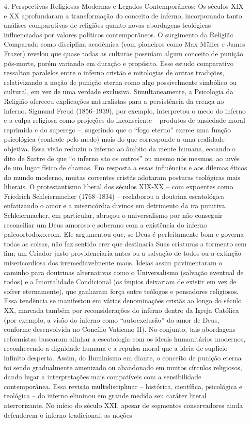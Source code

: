 4. Perspectivas Religiosas Modernas e Legados Contemporâneos: Os séculos XIX e XX aprofundaram a transformação do conceito de inferno, incorporando tanto análises comparativas de religiões quanto novas abordagens teológicas influenciadas por valores políticos contemporâneos. O surgimento da Religião Comparada como disciplina acadêmica (com pioneiros como Max Müller e James Frazer) revelou que quase todas as culturas possuíam algum conceito de punição pós-morte, porém variando em duração e propósito. Esse estudo comparativo ressaltou paralelos entre o inferno cristão e mitologias de outras tradições, relativizando a noção de punição eterna como algo possivelmente simbólico ou cultural, em vez de uma verdade exclusiva. Simultaneamente, a Psicologia da Religião ofereceu explicações naturalistas para a persistência da crença no inferno. Sigmund Freud (1856--1939), por exemplo, interpretou o medo do inferno e a culpa religiosa como projeções do inconsciente -- produtos de ansiedade moral reprimida e do superego --, sugerindo que o “fogo eterno” exerce uma função psicológica (controle pelo medo) mais do que corresponde a uma realidade objetiva. Essa visão reduziu o inferno ao âmbito da mente humana, ecoando o dito de Sartre de que “o inferno são os outros” ou mesmo nós mesmos, ao invés de um lugar físico de chamas. Em resposta a essas influências e aos dilemas éticos do mundo moderno, muitas correntes cristãs adotaram posturas teológicas mais liberais. O protestantismo liberal dos séculos XIX-XX -- com expoentes como Friedrich Schleiermacher (1768--1834) -- reelaborou a doutrina escatológica enfatizando o amor e a misericórdia divinos em detrimento da ira punitiva. Schleiermacher, em particular, abraçou o universalismo por não conseguir reconciliar um Deus amoroso e soberano com a existência do inferno paleoortodoxo.com. Ele argumentou que, se Deus é perfeitamente bom e governa todas as coisas, não faz sentido crer que destinaria Suas criaturas a tormento sem fim; um Criador justo providenciaria antes ou a salvação de todos ou a extinção misericordiosa dos irremediavelmente maus. Ideias assim pavimentaram o caminho para doutrinas alternativas como o Universalismo (salvação eventual de todos) e a Imortalidade Condicional (os ímpios deixariam de existir em vez de sofrer eternamente), que ganharam força entre teólogos e pensadores religiosos. Essa tendência se manifestou em várias denominações cristãs ao longo do século XX, marcada também por reconsiderações do inferno dentro da Igreja Católica (por exemplo, a visão do inferno como “autoexclusão” do amor de Deus, conforme desenvolvida no Concílio Vaticano II). No conjunto, tais abordagens reformistas buscaram alinhar a escatologia com os ideais humanitários modernos, reconhecendo a dignidade humana e a repulsa moral que a ideia de suplício infinito desperta. Assim, do Iluminismo em diante, o conceito de punição eterna foi sendo gradualmente amenizado ou abandonado em muitos círculos religiosos, dando lugar a interpretações mais compatíveis com a sensibilidade contemporânea. Essa revisão multidisciplinar -- histórica, científica, psicológica e teológica -- do inferno eliminou em grande medida seu caráter literal aterrorizante. No início do século XXI, apesar de segmentos conservadores ainda defenderem o inferno tradicional, as noções 